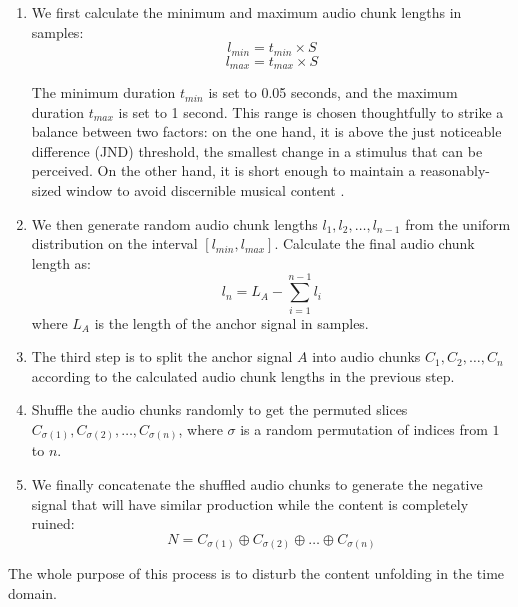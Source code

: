 \begin{enumerate}
\item We first calculate the minimum and maximum audio chunk lengths in samples:
\begin{equation}
l_{min} = t_{min} \times S
\end{equation}
\begin{equation}
l_{max} = t_{max} \times S
\end{equation}

The minimum duration $t_{min}$ is set to 0.05 seconds, and the maximum duration $t_{max}$ is set to 1 second. This range is chosen thoughtfully to strike a balance between two factors: on the one hand, it is above the just noticeable difference (JND) threshold, the smallest change in a stimulus that can be perceived. On the other hand, it is short enough to maintain a reasonably-sized window to avoid discernible musical content \cite{Fastl2007Just-NoticeableChanges}.

\item We then generate random audio chunk lengths $l_1, l_2, \ldots, l_{n-1}$ from the uniform distribution on the interval $[l_{min}, l_{max}]$. Calculate the final audio chunk length as:
\begin{equation}
l_n = L_A - \sum_{i=1}^{n-1} l_i
\end{equation}
where $L_A$ is the length of the anchor signal in samples.

\item The third step is to split the anchor signal $A$ into audio chunks $C_1, C_2, \ldots, C_n$ according to the calculated audio chunk lengths in the previous step.

\item Shuffle the audio chunks randomly to get the permuted slices $C_{\sigma(1)}, C_{\sigma(2)}, \ldots, C_{\sigma(n)}$, where $\sigma$ is a random permutation of indices from $1$ to $n$. 

\item We finally concatenate the shuffled audio chunks to generate the negative signal that will have similar production while the content is completely ruined:
\begin{equation}\label{eq:negative_signal}
N = C_{\sigma(1)} \oplus C_{\sigma(2)} \oplus \ldots \oplus C_{\sigma(n)}
\end{equation}
\end{enumerate}

The whole purpose of this process is to disturb the content unfolding in the time domain.

